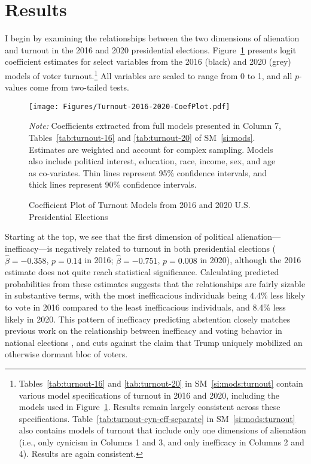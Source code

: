 \documentclass[12pt]{article}
\begin{document}
\section*{Results}\label{sec:results}

I begin by examining the relationships between the two dimensions of alienation and turnout in the 2016 and 2020 presidential elections. Figure~\ref{fig:coefplot-turnout-16-20} presents logit coefficient estimates for select variables from the 2016 (black) and 2020 (grey) models of voter turnout.\footnote{Tables~\ref{tab:turnout-16} and \ref{tab:turnout-20} in SM~\ref{si:mods:turnout} contain various model specifications of turnout in 2016 and 2020, including the models used in Figure~\ref{fig:coefplot-turnout-16-20}. Results remain largely consistent across these specifications. Table~\ref{tab:turnout-cyn-eff-separate} in SM~\ref{si:mods:turnout} also contains models of turnout that include only one dimensions of alienation (i.e., only cynicism in Columns 1 and 3, and only inefficacy in Columns 2 and 4). Results are again consistent.} All variables are scaled to range from 0 to 1, and all $p$-values come from two-tailed tests.

\begin{figure}[t!]
	\centering
	\texttt{[image: Figures/Turnout-2016-2020-CoefPlot.pdf]}
	\caption{Coefficient Plot of Turnout Models from 2016 and 2020 U.S. Presidential Elections}\label{fig:coefplot-turnout-16-20}
	\vspace{-2em}
	{\singlespacing\scriptsize \textit{Note:} Coefficients extracted from full models presented in Column 7,  Tables~\ref{tab:turnout-16} and \ref{tab:turnout-20} of SM~\ref{si:mods}. Estimates are weighted and account for complex sampling. Models also include political interest, education, race, income, sex, and age as co-variates. Thin lines represent 95\% confidence intervals, and thick lines represent 90\% confidence intervals.\par}
\end{figure}

Starting at the top, we see that the first dimension of political alienation---inefficacy---is negatively related to turnout in both presidential elections ($\hat{\beta} = -0.358$, $p = 0.14$ in 2016; $\hat{\beta} = -0.751$, $p = 0.008$ in 2020), although the 2016 estimate does not quite reach statistical significance. Calculating predicted probabilities from these estimates suggests that the relationships are fairly sizable in substantive terms, with the most inefficacious individuals being 4.4\% less likely to vote in 2016 compared to the least inefficacious individuals, and 8.4\% less likely in 2020. This pattern of inefficacy predicting abstention closely matches previous work on the relationship between inefficacy and voting behavior in national elections \parencite[e.g.,][]{aberbach1969alienation,southwell1998electoral}, and cuts against the claim that Trump uniquely mobilized an otherwise dormant bloc of voters. 
\end{document}
